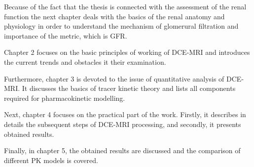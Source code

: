 Because of the fact that the thesis is connected with the assessment of the renal function the next chapter deals with the basics of the renal anatomy and physiology in order to understand the mechanism of glomerural filtration and importance of the metric, which is GFR.

Chapter 2 focuses on the basic principles of working of DCE-MRI and introduces the current trends and obstacles it their examination.  

Furthermore, chapter 3 is devoted to the issue of quantitative analysis of DCE-MRI. 
It discusses the  basics of tracer kinetic theory and lists all components required for pharmacokinetic modelling.  

Next, chapter 4 focuses on the practical part of the work.  
Firstly, it describes in details the subsequent steps of DCE-MRI processing, and secondly, it presents obtained results. 

Finally, in chapter 5, the obtained results are discussed and the comparison of different PK models is covered. 


